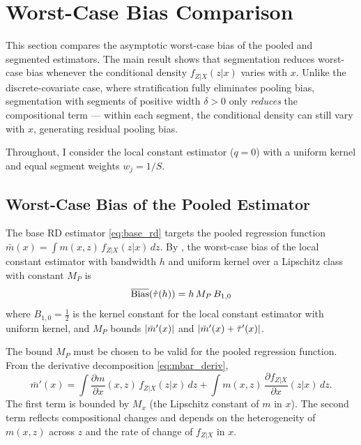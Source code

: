 \section{Worst-Case Bias Comparison}\label{sec:bias}

This section compares the asymptotic worst-case bias of the pooled and segmented estimators.
The main result shows that segmentation reduces worst-case bias whenever the conditional density $f_{Z|X}(z|x)$ varies with $x$.
Unlike the discrete-covariate case, where stratification fully eliminates pooling bias, segmentation with segments of positive width $\delta > 0$ only \emph{reduces} the compositional term --- within each segment, the conditional density can still vary with $x$, generating residual pooling bias.

Throughout, I consider the local constant estimator ($q = 0$) with a uniform kernel and equal segment weights $w_j = 1/S$.


\subsection{Worst-Case Bias of the Pooled Estimator}\label{sec:bias:pooled}

The base RD estimator \eqref{eq:base_rd} targets the pooled regression function $\bar{m}(x) = \int m(x,z)\, f_{Z|X}(z|x)\, dz$.
By \textcite{armstrong_simple_2020}, the worst-case bias of the local constant estimator with bandwidth $h$ and uniform kernel over a Lipschitz class with constant $M_P$ is
\begin{equation}\label{eq:bias_pooled}
	\overline{\mathrm{Bias}}(\hat{\tau}(h)) = h\, M_P\, B_{1,0}
\end{equation}
where $B_{1,0} = \frac{1}{2}$ is the kernel constant for the local constant estimator with uniform kernel, and $M_P$ bounds $\lvert\bar{m}'(x)\rvert$ and $\lvert\bar{m}'(x) + \bar{\tau}'(x)\rvert$.

The bound $M_P$ must be chosen to be valid for the pooled regression function.
From the derivative decomposition \eqref{eq:mbar_deriv},
\begin{equation}\label{eq:MP_decomp}
	\bar{m}'(x) = \int \frac{\partial m}{\partial x}(x,z)\, f_{Z|X}(z|x)\, dz + \int m(x,z)\, \frac{\partial f_{Z|X}}{\partial x}(z|x)\, dz.
\end{equation}
The first term is bounded by $M_x$ (the Lipschitz constant of $m$ in $x$).
The second term reflects compositional changes and depends on the heterogeneity of $m(x,z)$ across $z$ and the rate of change of $f_{Z|X}$ in $x$.

